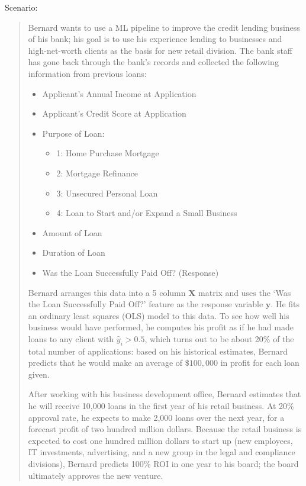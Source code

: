 \documentclass[10pt]{article}
\newcommand{\bX}{\bm{X}}
\newcommand{\by}{\bm{y}}
\begin{document}
Scenario:
\begin{quote}
    Bernard wants to use a ML pipeline to improve the credit lending business of his bank; his goal is to use his experience lending to businesses and high-net-worth clients as the basis for new retail division. The bank staff has gone back through the bank's records and
    collected the following information from previous loans:
    \begin{itemize}
        \item Applicant's Annual Income at Application
        \item Applicant's Credit Score at Application
        \item Purpose of Loan:
        \begin{itemize}
            \item 1: Home Purchase Mortgage
            \item 2: Mortgage Refinance
            \item 3: Unsecured Personal Loan
            \item 4: Loan to Start and/or Expand a Small Business
        \end{itemize}
        \item Amount of Loan
        \item Duration of Loan
        \item Was the Loan Successfully Paid Off? (Response)
    \end{itemize}
    Bernard arranges this data into a 5 column $\bX$ matrix and uses the `Was the Loan Successfully Paid Off?' feature as the response variable $\by$. He fits an ordinary least squares (OLS) model to this data. To see how well his business would have performed, he computes his profit as if he had made loans to any client with $\hat{y}_i > 0.5$, which turns out to be about 20\% of the total number of applications: based on his historical estimates, Bernard predicts that he would make an average of $\$100,000$ in profit for each loan given. 

    After working with his business development office, Bernard estimates that he will receive 10,000 loans in the first year of his retail business. At 20\% approval rate, he expects to make 2,000 loans over the next year, for a forecast profit of two hundred million dollars. Because the retail business is expected to cost one hundred million dollars to start up (new employees, IT investments, advertising, and a new group in the legal and compliance divisions), Bernard predicts 100\% ROI in one year to his board; the board ultimately approves the new venture.

    
\end{quote}
\end{document}
